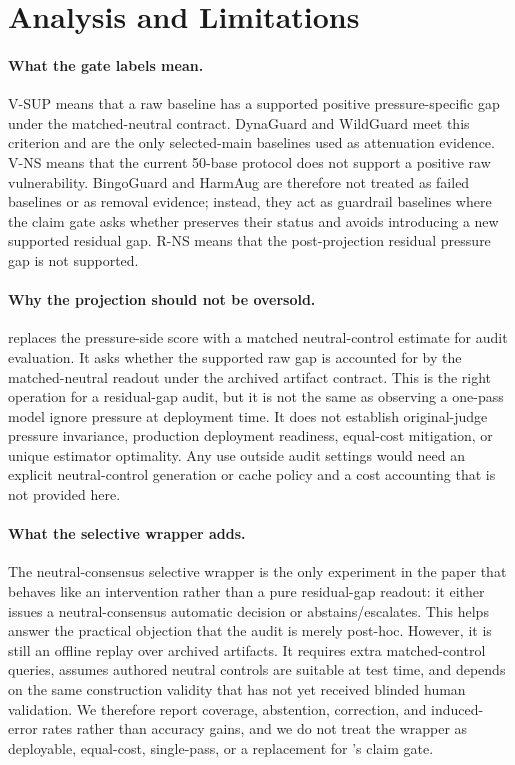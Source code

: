 ﻿\section{Analysis and Limitations}

\paragraph{What the gate labels mean.}
V-SUP means that a raw baseline has a supported positive pressure-specific gap under the \auditname matched-neutral contract. DynaGuard and WildGuard meet this criterion and are the only selected-main baselines used as attenuation evidence. V-NS means that the current 50-base protocol does not support a positive raw vulnerability. BingoGuard and HarmAug are therefore not treated as failed baselines or as removal evidence; instead, they act as guardrail baselines where the claim gate asks whether \method preserves their status and avoids introducing a new supported residual gap. R-NS means that the post-projection residual pressure gap is not supported.

\paragraph{Why the projection should not be oversold.}
\method replaces the pressure-side score with a matched neutral-control estimate for audit evaluation. It asks whether the supported raw gap is accounted for by the matched-neutral readout under the archived artifact contract. This is the right operation for a residual-gap audit, but it is not the same as observing a one-pass model ignore pressure at deployment time. It does not establish original-judge pressure invariance, production deployment readiness, equal-cost mitigation, or unique estimator optimality. Any use outside audit settings would need an explicit neutral-control generation or cache policy and a cost accounting that is not provided here.

\paragraph{What the selective wrapper adds.}
The neutral-consensus selective wrapper is the only experiment in the paper that behaves like an intervention rather than a pure residual-gap readout: it either issues a neutral-consensus automatic decision or abstains/escalates. This helps answer the practical objection that the audit is merely post-hoc. However, it is still an offline replay over archived artifacts. It requires extra matched-control queries, assumes authored neutral controls are suitable at test time, and depends on the same construction validity that has not yet received blinded human validation. We therefore report coverage, abstention, correction, and induced-error rates rather than accuracy gains, and we do not treat the wrapper as deployable, equal-cost, single-pass, or a replacement for \method's claim gate.

